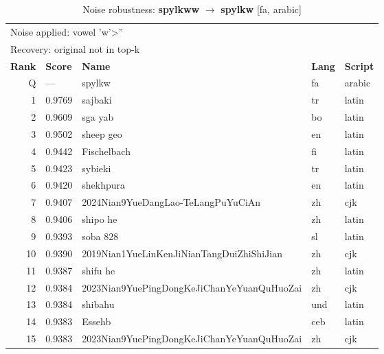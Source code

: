 \begin{table}[htbp]
\centering
\small
\caption{Noise robustness: \textbf{spylkww} $\rightarrow$ \textbf{spylkw} [fa, arabic]}
\label{tab:noise-34}
\begin{tabular}{rllll}
\toprule
\multicolumn{5}{l}{\small Noise applied: vowel 'w'>''} \\
\multicolumn{5}{l}{\small Recovery: original not in top-k} \\
\midrule
\textbf{Rank} & \textbf{Score} & \textbf{Name} & \textbf{Lang} & \textbf{Script} \\
\midrule
\rowcolor{gray!20} Q & --- & spylkw & fa & arabic \\
\midrule
1 & 0.9769 & sajbaki & tr & latin \\
2 & 0.9609 & sga yab & bo & latin \\
3 & 0.9502 & sheep geo & en & latin \\
4 & 0.9442 & Fischelbach & fi & latin \\
5 & 0.9423 & sybieki & tr & latin \\
6 & 0.9420 & shekhpura & en & latin \\
7 & 0.9407 & 2024Nian9YueDangLao-TeLangPuYuCiAn & zh & cjk \\
8 & 0.9406 & shipo he & zh & latin \\
9 & 0.9393 & soba 828 & sl & latin \\
10 & 0.9390 & 2019Nian1YueLinKenJiNianTangDuiZhiShiJian & zh & cjk \\
11 & 0.9387 & shifu he & zh & latin \\
12 & 0.9384 & 2023Nian9YuePingDongKeJiChanYeYuanQuHuoZai & zh & cjk \\
13 & 0.9384 & shibahu & und & latin \\
14 & 0.9383 & Essehb & ceb & latin \\
15 & 0.9383 & 2023Nian9YuePingDongKeJiChanYeYuanQuHuoZai & zh & cjk \\
\bottomrule
\end{tabular}
\end{table}

